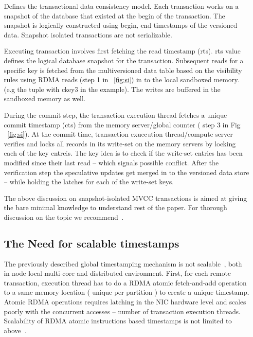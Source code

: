Defines the transactional data consistency model. Each transaction works on a snapshot of the database that
existed at the begin of the transaction. The snapshot is logically constructed using begin, end timestamps of the
versioned data. Snapshot isolated transactions are not serializable.

Executing transaction involves first fetching the read timestamp (rts). rts value defines the logical database
snapshot for the transaction. Subsequent reads for a specific key is fetched from the multiversioned data table
based on the visibility rules using RDMA reads (step 1 in ~\ref{fig:si}) in to the local sandboxed memory.(e.g the tuple with ckey\=3 in
the example). The writes are buffered in the sandboxed memory as well. 

During the commit step, the transaction execution thread fetches a unique commit timestamp (cts)
from the memory server/global counter ( step 3 in Fig ~\ref{fig:si}). At the commit time, 
transaction exuecution thread/compute server verifies and locks all records in its write-set on
the memory servers by locking each of the key entreis. The key idea is to check if the write-set
entries has been modified since their last read -- which signals possible conflict. After the verification
step the speculative updates get merged in to the versioned data store -- while holding the latches
for each of the write-set keys.

The above discussion on snapshot-isolated MVCC transactions is aimed at giving the bare minimal
knowledge to understand rest of the paper. For thorough discussion on the topic we recommend~\cite{namdb}.

\subsection{The Need for scalable timestamps}

The previously described global timestamping mechanism is not scalable~\cite{rethinking}, both
in node local multi-core and distributed environment.
First, for each remote transaction, execution thread has to do a RDMA atomic fetch-and-add 
operation to a same memory location ( unique per partition ) to create a unique timestamp.
Atomic RDMA operations requires latching in the NIC hardware level and scales poorly with the
concurrent accesses -- number of transaction execution threads.
Scalability of RDMA atomic instructions based timestamps is not limited to above~\cite{namdb}.


